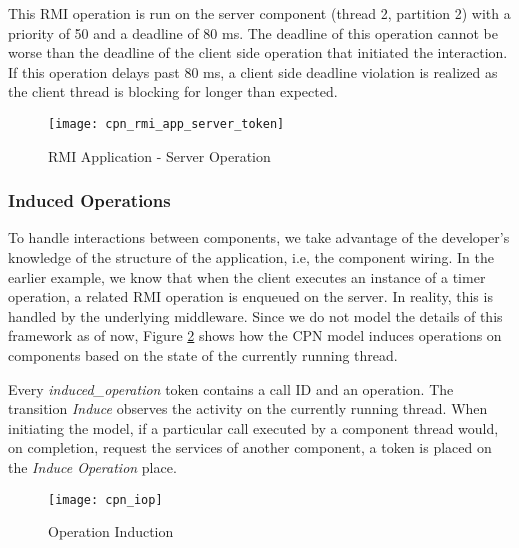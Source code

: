 
This RMI operation is run on the server component (thread 2, partition 2) with a priority of 50 and a deadline of 80 ms. The deadline of this operation cannot be worse than the deadline of the client side operation that initiated the interaction. If this operation delays past 80 ms, a client side deadline violation is realized as the client thread is blocking for longer than expected. 

\vspace{-0.08in}
\begin{figure}[ht]
\centering
\texttt{[image: cpn\_rmi\_app\_server\_token]}
\caption{RMI Application - Server Operation}
\label{fig:cpn_rmi_app_server_token}
\vspace{-0.14in}
\end{figure}

\subsubsection{Induced Operations}
\label{sec:Operation_Induction}

To handle interactions between components, we take advantage of the developer's knowledge of the structure of the application, i.e, the component wiring. In the earlier example, we know that when the client executes an instance of a timer operation, a related RMI operation is enqueued on the server. In reality, this is handled by the underlying middleware. Since we do not model the details of this framework as of now, Figure \ref{fig:cpn_iop} shows how the CPN model induces operations on components based on the state of the currently running thread. 

Every \emph{induced\_operation} token contains a call ID and an operation. The transition \emph{Induce} observes the activity on the currently running thread. When initiating the model, if a particular call executed by a component thread would, on completion, request the services of another component, a token is placed on the \emph{Induce Operation} place. 

\vspace{-0.06in}
\begin{figure}[ht]
\centering
\texttt{[image: cpn\_iop]}
\caption{Operation Induction}
\label{fig:cpn_iop}
\vspace{-0.14in}
\end{figure}

